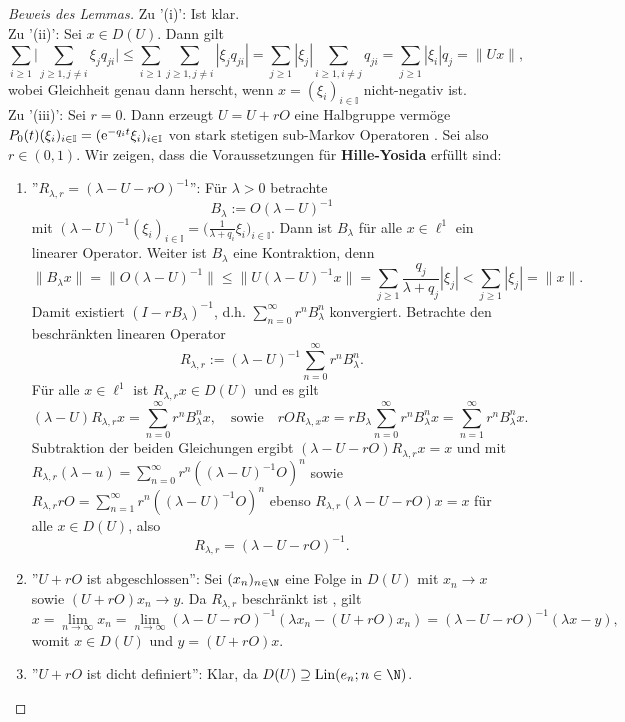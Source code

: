 \begin{proof}[Beweis des Lemmas] 
  Zu '(i)': Ist klar.\\
  Zu '(ii)': Sei $x\in D(U)$. Dann gilt $$\sum_{i\geq 1}\Bigg|\sum_{j\geq1, j\neq i}\xi_j q_{ji}\Bigg|\leq \sum_{i\geq 1}\sum_{j\geq1, j\neq i}|\xi_j q_{ji}|=\sum_{j\geq1}|\xi_j|\sum_{i\geq1, i\neq j}q_{ji}=\sum_{j\geq1}|\xi_i|q_j=\|Ux\|,$$ wobei Gleichheit genau dann herscht, wenn $x=(\xi_i)_{i\in\mathbb I}$ nicht-negativ ist.\\
  Zu '(iii)': Sei $r=0$. Dann erzeugt $U=U+rO$ eine Halbgruppe vermöge $P_0(t)(\xi_i)_{i\in\mathbb I}=(\text e^{-q_it}\xi_i)_{i\in\mathbb I}$ von stark stetigen sub-Markov Operatoren . Sei also $r\in(0,1)$. Wir zeigen, dass die Voraussetzungen für \textbf{Hille-Yosida} erfüllt sind:
  \begin{enumerate}
  \item ''$R_{\lambda,r}=(\lambda-U-rO)^{-1}$'': Für $\lambda >0$ betrachte 
  $$B_\lambda:=O(\lambda-U)^{-1}$$
  mit $(\lambda-U)^{-1}(\xi_i)_{i\in\mathbb I}=\big(\frac{1}{\lambda+q_i}\xi_i\big)_{i\in\mathbb I}$. Dann ist $B_\lambda$ für alle $x\in\ell^1$ ein linearer Operator. Weiter ist $B_\lambda$ eine Kontraktion, denn 
  $$\|B_\lambda x\|=\|O(\lambda-U)^{-1}\|\leq\|U(\lambda-U)^{-1}x\|=\sum_{j\geq1}\frac{q_j}{\lambda+q_j}|\xi_j|< \sum_{j\geq1}|\xi_j|=\|x\|.$$
  Damit existiert $(I-rB_\lambda)^{-1}$, d.h. $\sum_{n=0}^\infty r^n B_\lambda ^n$ konvergiert. Betrachte den beschränkten linearen Operator 
  $$R_{\lambda,r}:=(\lambda-U)^{-1}\sum_{n=0}^\infty r^n B_\lambda^n.$$ 
  Für alle $x\in\ell^1$ ist $R_{\lambda,r}x\in D(U)$ und es gilt
  $$(\lambda-U)R_{\lambda,r}x=\sum_{n=0}^\infty r^n B_\lambda^n x,\quad\text{sowie}\quad rOR_{\lambda,x}x=r B_\lambda\sum_{n=0}^\infty r^n B_\lambda^n x=\sum_{n=1}^\infty r^n B_\lambda^n x.$$
  Subtraktion der beiden Gleichungen ergibt $(\lambda-U-rO)R_{\lambda,r}x=x$ und mit $R_{\lambda,r}(\lambda-u)=\sum_{n=0}^\infty r^n((\lambda-U)^{-1}O)^n$ sowie $R_{\lambda, r}rO=\sum_{n=1}^\infty r^{n}((\lambda-U)^{-1}O)^{n}$ ebenso $R_{\lambda,r}(\lambda-U-rO)x=x$ für alle $x\in D(U)$, also 
  $$R_{\lambda,r}=(\lambda-U-rO)^{-1}.$$
  \item ''$U+rO$ ist abgeschlossen'': Sei $(x_n)_{n\in\N}$ eine Folge in $D(U)$ mit $x_n\to x$ sowie $(U+rO)x_n\to y$. Da $R_{\lambda,r}$ beschränkt ist , gilt   
  $$x=\lim_{n\to\infty} x_n=\lim_{n\to\infty}(\lambda-U-rO)^{-1}(\lambda x_n-(U+rO)x_n)=(\lambda-U-rO)^{-1}(\lambda x-y),$$
  womit $x\in D(U)$ und $y=(U+rO)x$.
  \item ''$U+rO$ ist dicht definiert'': Klar, da $D(U)\supseteq\text{Lin}(e_n; n\in\N)$.

\end{enumerate}
\end{proof}
